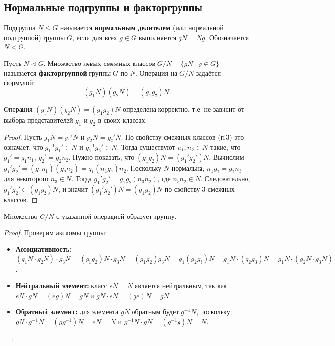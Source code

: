 \documentclass[10pt]{article}
\begin{document}
\subsection{Нормальные подгруппы и факторгруппы}
\begin{definition}
Подгруппа $N \le G$ называется \textbf{нормальным делителем} (или нормальной подгруппой) группы $G$, если для всех $g \in G$ выполняется $gN = Ng$. Обозначается $N \triangleleft G$.
\end{definition}

\begin{definition}
Пусть $N \triangleleft G$. Множество левых смежных классов $G/N = \{gN \mid g \in G\}$ называется \textbf{факторгруппой} группы $G$ по $N$. Операция на $G/N$ задаётся формулой:
$$(g_1 N)(g_2 N) = (g_1 g_2) N.$$
\end{definition}

\begin{stat}
Операция $(g_1 N)(g_2 N) = (g_1 g_2) N$ определена корректно, т.е. не зависит от выбора представителей $g_1$ и $g_2$ в своих классах.
\end{stat}
\begin{proof}
Пусть $g_1 N = g_1' N$ и $g_2 N = g_2' N$. По свойству смежных классов (п.3) это означает, что $g_1^{-1} g_1' \in N$ и $g_2^{-1} g_2' \in N$. Тогда существуют $n_1, n_2 \in N$ такие, что $g_1' = g_1 n_1$, $g_2' = g_2 n_2$. Нужно показать, что $(g_1 g_2) N = (g_1' g_2') N$.
Вычислим $g_1' g_2' = (g_1 n_1)(g_2 n_2) = g_1 (n_1 g_2) n_2$. Поскольку $N$ нормальна, $n_1 g_2 = g_2 n_3$ для некоторого $n_3 \in N$. Тогда $g_1' g_2' = g_1 g_2 (n_3 n_2)$, где $n_3 n_2 \in N$. Следовательно, $g_1' g_2' \in (g_1 g_2) N$, и значит $(g_1' g_2') N = (g_1 g_2) N$ по свойству 3 смежных классов.
\end{proof}

\begin{stat}
Множество $G/N$ с указанной операцией образует группу.
\end{stat}
\begin{proof}
Проверим аксиомы группы:
\begin{itemize}
    \item \textbf{Ассоциативность:} $(g_1 N \cdot g_2 N) \cdot g_3 N = (g_1 g_2) N \cdot g_3 N = (g_1 g_2) g_3 N = g_1 (g_2 g_3) N = g_1 N \cdot (g_2 g_3) N = g_1 N \cdot (g_2 N \cdot g_3 N)$.
    \item \textbf{Нейтральный элемент:} класс $eN = N$ является нейтральным, так как $eN \cdot gN = (e g) N = gN$ и $gN \cdot eN = (g e) N = gN$.
    \item \textbf{Обратный элемент:} для элемента $gN$ обратным будет $g^{-1} N$, поскольку $gN \cdot g^{-1} N = (g g^{-1}) N = eN = N$ и $g^{-1} N \cdot gN = (g^{-1} g) N = N$.
\end{itemize}
\end{proof}
\end{document}
